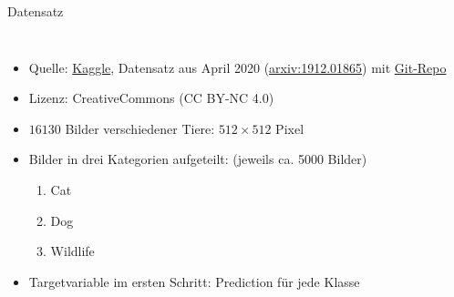 \documentclass[aspectratio=1610, 9pt]{beamer}
\begin{document}
\begin{frame}{Datensatz}
  \begin{columns}


    \begin{itemize}
    \item Quelle: \href{https://www.kaggle.com/andrewmvd/animal-faces?}{Kaggle}, Datensatz aus April 2020 (\href{https://arxiv.org/abs/1912.01865}{arxiv:1912.01865}) mit \href{https://github.com/clovaai/stargan-v2}{Git-Repo}
    \item Lizenz: CreativeCommons (CC BY-NC 4.0)
    \item $16130$ Bilder verschiedener Tiere: $512\times 512$ Pixel
    \item Bilder in drei Kategorien aufgeteilt: (jeweils ca. 5000 Bilder)
      \begin{enumerate}
      \item Cat
      \item Dog
      \item Wildlife
      \end{enumerate}
    \item Targetvariable im ersten Schritt: Prediction für jede Klasse
    \end{itemize}


\end{columns}
\end{frame}
\end{document}

